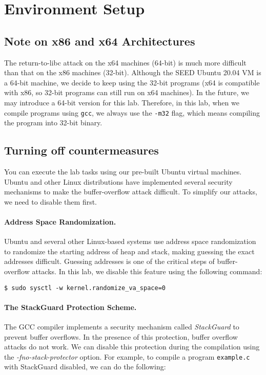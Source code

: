 \section{Environment Setup}


\subsection{Note on x86 and x64 Architectures}


The return-to-libc attack on the x64 machines (64-bit)
is much more difficult than that on the x86 machines (32-bit).
Although the SEED Ubuntu 20.04 VM is a 64-bit machine,
we decide to keep using the 32-bit programs (x64 is
compatible with x86, so 32-bit programs can still 
run on x64 machines). In the future, we may 
introduce a 64-bit version for this lab. 
Therefore, in this lab, when we compile 
programs using \texttt{gcc}, we always 
use the \texttt{-m32} flag, which means compiling 
the program into 32-bit binary. 


\subsection{Turning off countermeasures}

You can execute the lab tasks using our pre-built Ubuntu virtual machines.
Ubuntu and other Linux distributions have implemented several
security mechanisms to make the buffer-overflow attack difficult.
To simplify our attacks, we need to disable them first.


\paragraph{Address Space Randomization.}
Ubuntu and several other Linux-based systems use address space
randomization to randomize the starting address of heap and
stack, making guessing the exact addresses difficult. Guessing
addresses is one of the critical steps of buffer-overflow attacks.  In
this lab, we disable this feature using the following command:

\begin{lstlisting}
$ sudo sysctl -w kernel.randomize_va_space=0
\end{lstlisting}


\paragraph{The StackGuard Protection Scheme.}
The GCC compiler implements a security mechanism called
\textit{StackGuard} to prevent buffer overflows. In the presence of this
protection, buffer overflow attacks do not work. We can disable this
protection during the compilation using the
\emph{-fno-stack-protector} option. For example, to compile a program
\texttt{example.c} with StackGuard disabled, we can do the following:


